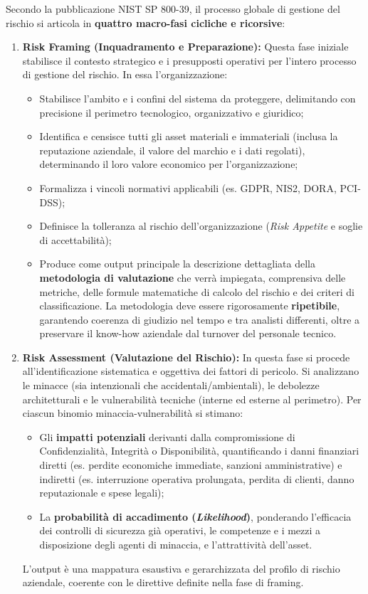\documentclass[../../main.tex]{subfiles}
\begin{document}
Secondo la pubblicazione NIST SP 800-39, il processo globale di gestione del rischio si articola in \textbf{quattro macro-fasi cicliche e ricorsive}:

\begin{enumerate}
    \item \textbf{Risk Framing (Inquadramento e Preparazione):} Questa fase iniziale stabilisce il contesto strategico e i presupposti operativi per l'intero processo di gestione del rischio. In essa l'organizzazione:
    \begin{itemize}
        \item Stabilisce l'ambito e i confini del sistema da proteggere, delimitando con precisione il perimetro tecnologico, organizzativo e giuridico;
        \item Identifica e censisce tutti gli asset materiali e immateriali (inclusa la reputazione aziendale, il valore del marchio e i dati regolati), determinando il loro valore economico per l'organizzazione;
        \item Formalizza i vincoli normativi applicabili (es. GDPR, NIS2, DORA, PCI-DSS);
        \item Definisce la tolleranza al rischio dell'organizzazione (\textit{Risk Appetite} e soglie di accettabilità);
        \item Produce come output principale la descrizione dettagliata della \textbf{metodologia di valutazione} che verrà impiegata, comprensiva delle metriche, delle formule matematiche di calcolo del rischio e dei criteri di classificazione. La metodologia deve essere rigorosamente \textbf{ripetibile}, garantendo coerenza di giudizio nel tempo e tra analisti differenti, oltre a preservare il know-how aziendale dal turnover del personale tecnico.
    \end{itemize}
    
    \item \textbf{Risk Assessment (Valutazione del Rischio):} In questa fase si procede all'identificazione sistematica e oggettiva dei fattori di pericolo. Si analizzano le minacce (sia intenzionali che accidentali/ambientali), le debolezze architetturali e le vulnerabilità tecniche (interne ed esterne al perimetro). Per ciascun binomio minaccia-vulnerabilità si stimano:
    \begin{itemize}
        \item Gli \textbf{impatti potenziali} derivanti dalla compromissione di Confidenzialità, Integrità o Disponibilità, quantificando i danni finanziari diretti (es. perdite economiche immediate, sanzioni amministrative) e indiretti (es. interruzione operativa prolungata, perdita di clienti, danno reputazionale e spese legali);
        \item La \textbf{probabilità di accadimento (\textit{Likelihood})}, ponderando l'efficacia dei controlli di sicurezza già operativi, le competenze e i mezzi a disposizione degli agenti di minaccia, e l'attrattività dell'asset.
    \end{itemize}
    L'output è una mappatura esaustiva e gerarchizzata del profilo di rischio aziendale, coerente con le direttive definite nella fase di framing.
    

\end{enumerate}
\end{document}
